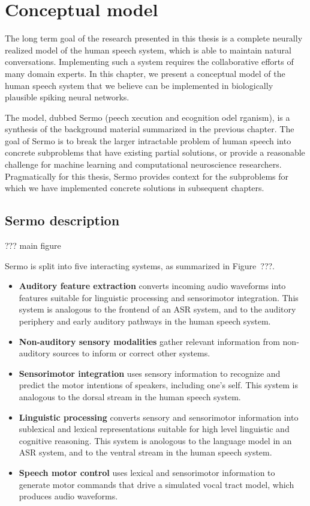 \chapter{Conceptual model}

The long term goal of the research
presented in this thesis
is a complete neurally realized model
of the human speech system,
which is able to maintain
natural conversations.
Implementing such a system
requires the collaborative efforts
of many domain experts.
In this chapter, we present
a conceptual model of the human speech system
that we believe can be implemented
in biologically plausible spiking neural networks.

The model, dubbed Sermo
(peech xecution and ecognition
odel rganism),
is a synthesis of the background material
summarized in the previous chapter.
The goal of Sermo
is to break the larger
intractable problem of human speech
into concrete subproblems
that have existing partial solutions,
or provide a reasonable challenge
for machine learning
and computational neuroscience researchers.
Pragmatically for this thesis,
Sermo provides context for
the subproblems for which
we have implemented concrete solutions
in subsequent chapters.

\section{Sermo description}

??? main figure

Sermo is split into five interacting systems,
as summarized in Figure~???.
\begin{itemize}
  \item \textbf{Auditory feature extraction}
    converts incoming audio waveforms into
    features suitable for linguistic processing
    and sensorimotor integration.
    This system is analogous to the frontend
    of an ASR system,
    and to the auditory periphery and
    early auditory pathways in the human speech system.
  \item \textbf{Non-auditory sensory modalities}
    gather relevant information
    from non-auditory sources
    to inform or correct other systems.
  \item \textbf{Sensorimotor integration}
    uses sensory information to
    recognize and predict the motor intentions
    of speakers, including one's self.
    This system is analogous to the
    dorsal stream in the human speech system.
  \item \textbf{Linguistic processing}
    converts sensory and sensorimotor information
    into sublexical and lexical representations
    suitable for high level linguistic
    and cognitive reasoning.
    This system is anologous to
    the language model in an ASR system,
    and to the ventral stream
    in the human speech system.
  \item \textbf{Speech motor control}
    uses lexical and sensorimotor information
    to generate motor commands
    that drive a simulated vocal tract model,
    which produces audio waveforms.
\end{itemize}

